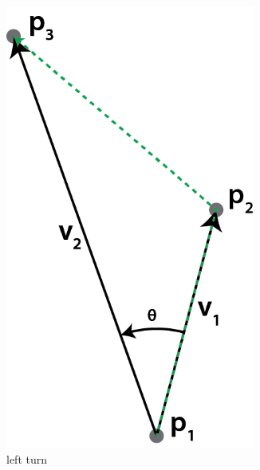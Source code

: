 \begin{figure}
	\centering
	\begin{subfigure}[b]{0.3\textwidth}
		\centering
		\includegraphics[width=0.9\textwidth]{./img/b_LeftTurn.png}
		\caption{left turn}
		\label{subfig:b:LeftTurn}
	\end{subfigure}
	\begin{subfigure}[b]{0.3\textwidth}
		\centering

\end{subfigure}
\end{figure}
